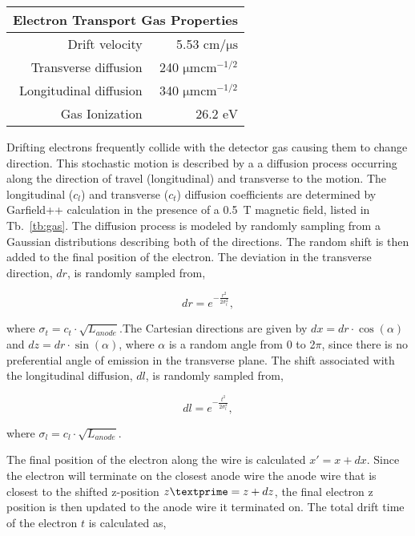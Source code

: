 \begin{table*}\centering
{}
\begin{tabular}{@{}rr@{}}\toprule 
\multicolumn{2}{c}{Electron Transport Gas Properties} \\
 \midrule
Drift velocity & 5.53 $\si{\centi\meter\per\micro\second}$\\
Transverse diffusion & 240 $\si{\micro \meter \centi\meter}^{-1/2}$\\
Longitudinal diffusion &  340 $\si{\micro \meter \centi\meter}^{-1/2}$\\
Gas Ionization & 26.2 $\si{\eV}$\\
\bottomrule
\end{tabular}
\caption{An overview of the properties of the TPC}
\label{tb:gas}
\end{table*}

Drifting electrons frequently collide with the detector gas causing them to change direction. This stochastic motion is  described by a a diffusion process occurring along the direction of travel (longitudinal) and transverse to the motion. The longitudinal ($c_{l}$) and transverse ($c_{t}$) diffusion coefficients are determined by Garfield++ calculation in the presence of a \SI{0.5}{\tesla} magnetic field, listed in Tb.~\ref{tb:gas}. The diffusion process is modeled by randomly sampling from a Gaussian distributions describing both of the directions. The random shift is then added to the final position of the electron. The deviation in the transverse direction, $dr$, is randomly sampled from,

\begin{equation}
dr = e^{-\frac{r^2}{2\sigma_{t}^2}},
\end{equation}

where $\sigma_{t}=c_{t}\cdot\sqrt{L_{anode}}$.The Cartesian directions are given by $dx = dr \cdot \cos(\alpha)$ and $dz = dr \cdot \sin(\alpha)$, where $\alpha$ is a random angle from 0 to 2$\pi$, since there is no preferential angle  of emission in the transverse plane. The shift associated with the longitudinal diffusion, $dl$, is randomly sampled from, 

\begin{equation}
dl = e^{-\frac{t^2}{2\sigma_{l}^2}},
\end{equation}

where $\sigma_{l}=c_{l}\cdot\sqrt{L_{anode}}$. 

The final position of the electron along the wire is calculated  $x' = x + dx$. Since the electron will terminate on the closest anode wire the anode wire that is closest to the shifted z-position $z\textprime = z + dz$, the final electron z position is then updated to the anode wire it terminated on. The total drift time of the electron $t$ is calculated as,

